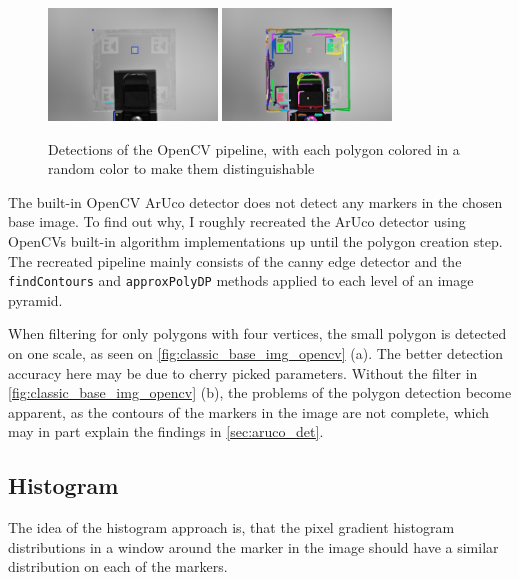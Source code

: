 \documentclass[10pt]{book}
\begin{document}
\begin{figure}
  \centering
     {\includegraphics[width=0.4\textwidth]{image/classic_base_img_opencv_det_small}}
     {\includegraphics[width=0.4\textwidth]{image/classic_base_img_opencv_det_all}}
  \caption{Detections of the \ac{OpenCV} pipeline, with each polygon colored in a random color to make them distinguishable}
  \label{fig:classic_base_img_opencv}
\end{figure}

The built-in \ac{OpenCV} \ac{ArUco} detector does not detect any markers in the chosen base image. To find out why, I roughly recreated the \ac{ArUco} detector using \acp{OpenCV} built-in algorithm implementations up until the polygon creation step. The recreated pipeline mainly consists of the canny edge detector and the \texttt{findContours} and \texttt{approxPolyDP} methods applied to each level of an image pyramid. 

When filtering for only polygons with four vertices, the small polygon is detected on one scale, as seen on \autoref{fig:classic_base_img_opencv} (a). The better detection accuracy here may be due to cherry picked parameters. Without the filter in \autoref{fig:classic_base_img_opencv} (b), the problems of the polygon detection become apparent, as the contours of the markers in the image are not complete, which may in part explain the findings in \autoref{sec:aruco_det}.

\subsection{Histogram}

The idea of the histogram approach is, that the pixel gradient histogram distributions in a window around the marker in the image should have a similar distribution on each of the markers.
\end{document}
